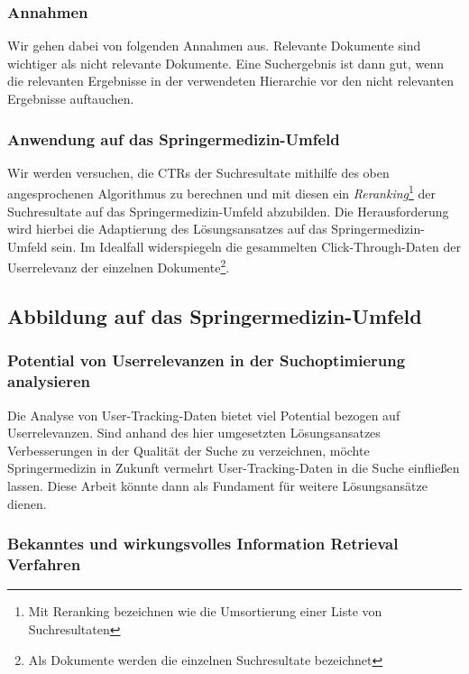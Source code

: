 \subsubsection{Annahmen}
\label{sec:Einfuehrung:ZielArbeit:Suchoptimierung:Annahmen}

Wir gehen dabei von folgenden Annahmen aus. Relevante Dokumente sind wichtiger als nicht relevante Dokumente. Eine Suchergebnis ist dann gut, wenn die relevanten Ergebnisse in der verwendeten Hierarchie vor den nicht relevanten Ergebnisse auftauchen. 

\subsubsection{Anwendung auf das Springermedizin-Umfeld}
\label{sec:Einfuehrung:ZielArbeit:Suchoptimierung:AnwendungSpringermedizin-Umfeld}

Wir werden versuchen, die CTRs der Suchresultate mithilfe des oben angesprochenen Algorithmus zu berechnen und mit diesen ein \textit{Reranking}\footnote{Mit Reranking bezeichnen wie die Umsortierung einer Liste von Suchresultaten} der Suchresultate auf das Springermedizin-Umfeld abzubilden. Die Herausforderung wird hierbei die Adaptierung des Lösungsansatzes auf das Springermedizin-Umfeld sein. Im Idealfall widerspiegeln die gesammelten Click-Through-Daten der Userrelevanz der einzelnen Dokumente\footnote{Als Dokumente werden die einzelnen Suchresultate bezeichnet}.

\subsection{Abbildung auf das Springermedizin-Umfeld}
\label{sec:Einfuehrung:ZielArbeit:AbbildungSpringermedizinUmfeld}

\subsubsection{Potential von Userrelevanzen in der Suchoptimierung analysieren}
\label{sec:Einfuehrung:ZielArbeit:Potential}

Die Analyse von User-Tracking-Daten bietet viel Potential bezogen auf Userrelevanzen. Sind anhand des hier umgesetzten Lösungsansatzes Verbesserungen in der Qualität der Suche zu verzeichnen, möchte Springermedizin in Zukunft vermehrt User-Tracking-Daten in die Suche einfließen lassen. Diese Arbeit könnte dann als Fundament für weitere Lösungsansätze dienen.

\subsubsection{Bekanntes und wirkungsvolles Information Retrieval Verfahren}
\label{sec:Einfuehrung:ZielArbeit:AbbildungSpringermedizinUmfeld:InformationRetrievalVerfahren}


